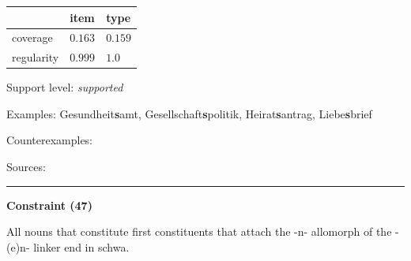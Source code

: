 \vspace{-0.25em}

\begin{table}[!ht]
\begin{center}
\setlength{\extrarowheight}{1pt}
\begin{tabularx}{\columnwidth}{|X|X|X|}
\hline
 & item & type \\
\hline
 coverage & $0.163$ & $0.159$ \\
\hline
 regularity & $0.999$ & $1.0$ \\
\hline
\end{tabularx}
\end{center}
\end{table}

\vspace{-1.35em}

\noindent
Support level: \textit{supported}

\vspace{0.3em}

\noindent
Examples: Gesundheit\textbf{s}amt, Gesellschaft\textbf{s}politik, Heirat\textbf{s}antrag, Liebe\textbf{s}brief

\noindent
Counterexamples: 

\vspace{0.3em}

\noindent
Sources: \citet[73]{ortner_mueller-bollhagen_1991}

\vspace{0.35em}
\hrule




\vspace{0.4em}

\begin{center}
\textbf{Constraint (47)}
\end{center}

\noindent
All nouns that constitute first constituents that attach the -n- allomorph of the -(e)n- linker end in schwa.
\vspace{0.5em}


